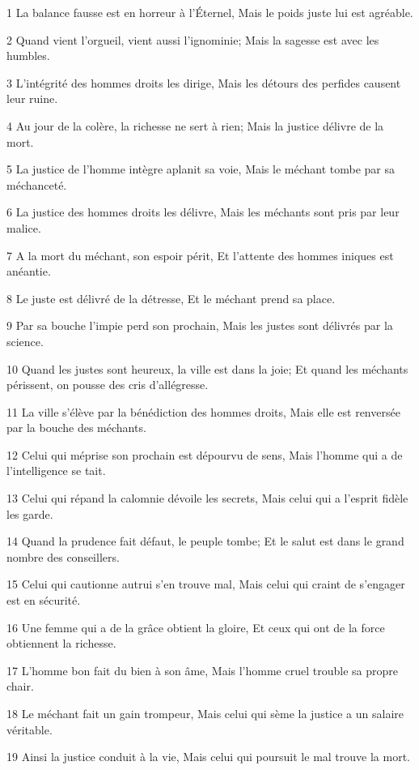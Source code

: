 \par 1 La balance fausse est en horreur à l'Éternel, Mais le poids juste lui est agréable.
\par 2 Quand vient l'orgueil, vient aussi l'ignominie; Mais la sagesse est avec les humbles.
\par 3 L'intégrité des hommes droits les dirige, Mais les détours des perfides causent leur ruine.
\par 4 Au jour de la colère, la richesse ne sert à rien; Mais la justice délivre de la mort.
\par 5 La justice de l'homme intègre aplanit sa voie, Mais le méchant tombe par sa méchanceté.
\par 6 La justice des hommes droits les délivre, Mais les méchants sont pris par leur malice.
\par 7 A la mort du méchant, son espoir périt, Et l'attente des hommes iniques est anéantie.
\par 8 Le juste est délivré de la détresse, Et le méchant prend sa place.
\par 9 Par sa bouche l'impie perd son prochain, Mais les justes sont délivrés par la science.
\par 10 Quand les justes sont heureux, la ville est dans la joie; Et quand les méchants périssent, on pousse des cris d'allégresse.
\par 11 La ville s'élève par la bénédiction des hommes droits, Mais elle est renversée par la bouche des méchants.
\par 12 Celui qui méprise son prochain est dépourvu de sens, Mais l'homme qui a de l'intelligence se tait.
\par 13 Celui qui répand la calomnie dévoile les secrets, Mais celui qui a l'esprit fidèle les garde.
\par 14 Quand la prudence fait défaut, le peuple tombe; Et le salut est dans le grand nombre des conseillers.
\par 15 Celui qui cautionne autrui s'en trouve mal, Mais celui qui craint de s'engager est en sécurité.
\par 16 Une femme qui a de la grâce obtient la gloire, Et ceux qui ont de la force obtiennent la richesse.
\par 17 L'homme bon fait du bien à son âme, Mais l'homme cruel trouble sa propre chair.
\par 18 Le méchant fait un gain trompeur, Mais celui qui sème la justice a un salaire véritable.
\par 19 Ainsi la justice conduit à la vie, Mais celui qui poursuit le mal trouve la mort.
